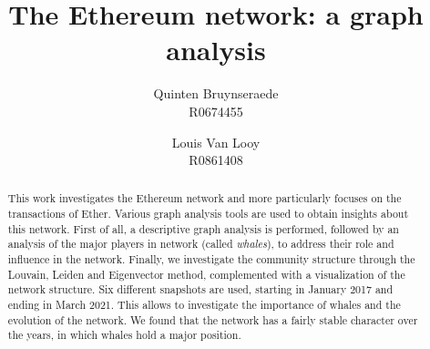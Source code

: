 \documentclass[10pt,a4paper]{article}
\author{Quinten Bruynseraede  \\ R0674455 \and Louis Van Looy \\ R0861408}
\title{The Ethereum network: a graph analysis}
\begin{document}
\maketitle

\begin{abstract}
	
This work investigates the Ethereum network and more particularly focuses on the transactions of Ether. Various graph analysis tools are used to obtain insights about this network. First of all, a descriptive graph analysis is performed, followed by an analysis of the major players in network (called \textit {whales}), to address their role and influence in the network. Finally, we investigate the community structure through the Louvain, Leiden and Eigenvector method, complemented with a visualization of the network structure. Six different snapshots are used, starting in January 2017 and ending in March 2021. This allows to investigate the importance of whales and the evolution of the network. We found that the network has a fairly stable character over the years, in which whales hold a major position.
\end{abstract}
\end{document}

